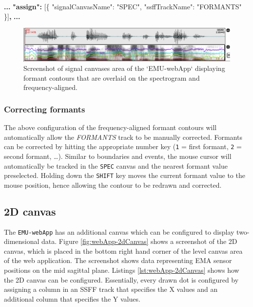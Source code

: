 \documentclass[]{book}
\newenvironment{Shaded}{\begin{snugshade}}{\end{snugshade}}
\newcommand{\DataTypeTok}[1]{\textcolor[rgb]{0.13,0.29,0.53}{#1}}
\newcommand{\ErrorTok}[1]{\textcolor[rgb]{0.64,0.00,0.00}{\textbf{#1}}}
\newcommand{\FunctionTok}[1]{\textcolor[rgb]{0.00,0.00,0.00}{#1}}
\newcommand{\OtherTok}[1]{\textcolor[rgb]{0.56,0.35,0.01}{#1}}
\newcommand{\StringTok}[1]{\textcolor[rgb]{0.31,0.60,0.02}{#1}}
\begin{document}
\begin{Shaded}
\begin{Highlighting}[]
\ErrorTok{...}
\ErrorTok{"assign":} \OtherTok{[}\FunctionTok{\{}
    \DataTypeTok{"signalCanvasName"}\FunctionTok{:} \StringTok{"SPEC"}\FunctionTok{,}
    \DataTypeTok{"ssffTrackName"}\FunctionTok{:} \StringTok{"FORMANTS"}
\FunctionTok{\}}\OtherTok{]}\ErrorTok{,}
\ErrorTok{...}
\end{Highlighting}
\end{Shaded}

\begin{figure}

{\centering \includegraphics[width=1\linewidth]{pics/emu-webAppOverlayFreqAlg} 

}

\caption{Screenshot of signal canvases area of the `EMU-webApp` displaying formant contours that are overlaid on the spectrogram and frequency-aligned.}\label{fig:webApp-overlay2}
\end{figure}

\hypertarget{correcting-formants}{%
\subsubsection{Correcting formants}\label{correcting-formants}}

The above configuration of the frequency-aligned formant contours will automatically allow the \emph{FORMANTS} track to be manually corrected. Formants can be corrected by hitting the appropriate number key (\texttt{1} = first formant, \texttt{2} = second formant, \ldots{}). Similar to boundaries and events, the mouse cursor will automatically be tracked in the \texttt{SPEC} canvas and the nearest formant value preselected. Holding down the \texttt{SHIFT} key moves the current formant value to the mouse position, hence allowing the contour to be redrawn and corrected.

\hypertarget{d-canvas}{%
\subsection{2D canvas}\label{d-canvas}}

The \texttt{EMU-webApp} has an additional canvas which can be configured to display two-dimensional data. Figure \ref{fig:webApp-2dCanvas} shows a screenshot of the 2D canvas, which is placed in the bottom right hand corner of the level canvas area of the web application. The screenshot shows data representing EMA sensor positions on the mid sagittal plane. Listings \ref{lst:webApp-2dCanvas} shows how the 2D canvas can be configured. Essentially, every drawn dot is configured by assigning a column in an SSFF track that specifies the X values and an additional column that specifies the Y values.
\end{document}

